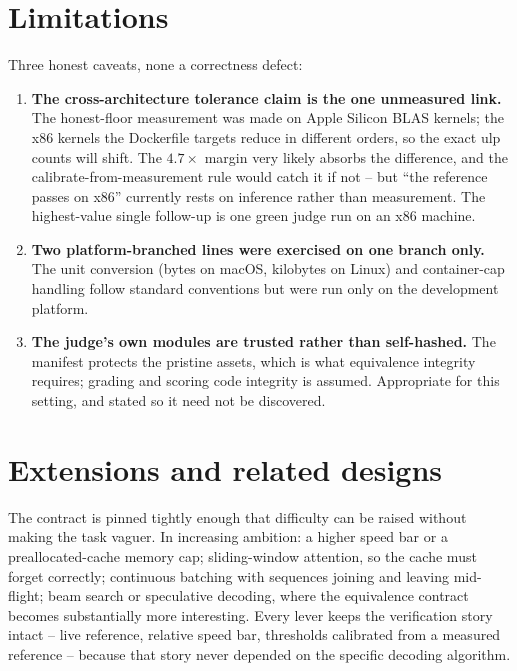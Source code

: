 \documentclass[11pt]{article}
\newcommand{\pc}[1]{\texttt{\detokenize{#1}}}
\begin{document}
\section{Limitations}

Three honest caveats, none a correctness defect:

\begin{enumerate}[leftmargin=1.4em,itemsep=3pt]
\item \textbf{The cross-architecture tolerance claim is the one unmeasured link.} The
honest-floor measurement was made on Apple Silicon BLAS kernels; the x86 kernels the
Dockerfile targets reduce in different orders, so the exact ulp counts will shift. The
$4.7\times$ margin very likely absorbs the difference, and the
calibrate-from-measurement rule would catch it if not -- but ``the reference passes on
x86'' currently rests on inference rather than measurement. The highest-value single
follow-up is one green judge run on an x86 machine.
\item \textbf{Two platform-branched lines were exercised on one branch only.} The
\pc{ru_maxrss} unit conversion (bytes on macOS, kilobytes on Linux) and
container-cap handling follow standard conventions but were run only on the
development platform.
\item \textbf{The judge's own modules are trusted rather than self-hashed.} The
manifest protects the pristine assets, which is what equivalence integrity requires;
grading and scoring code integrity is assumed. Appropriate for this setting, and
stated so it need not be discovered.
\end{enumerate}

\section{Extensions and related designs}

The contract is pinned tightly enough that difficulty can be raised without making the
task vaguer. In increasing ambition: a higher speed bar or a preallocated-cache memory
cap; sliding-window attention, so the cache must forget correctly; continuous batching
with sequences joining and leaving mid-flight; beam search or speculative decoding,
where the equivalence contract becomes substantially more interesting. Every lever
keeps the verification story intact -- live reference, relative speed bar, thresholds
calibrated from a measured reference -- because that story never depended on the
specific decoding algorithm.
\end{document}
